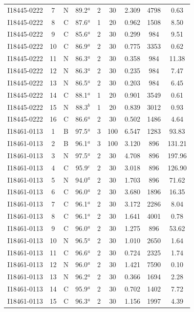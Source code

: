 \begin{table}
\begin{tabular}{ccccccccc}
I18445-0222 & 7 & N & 89.2$^{a}$ & 2 & 30 & 2.309 & 4798 & 0.63 \\
I18445-0222 & 8 & C & 87.6$^{a}$ & 1 & 20 & 0.962 & 1508 & 8.50 \\
I18445-0222 & 9 & C & 85.6$^{a}$ & 2 & 30 & 0.299 & 984 & 9.51 \\
I18445-0222 & 10 & C & 86.9$^{a}$ & 2 & 30 & 0.775 & 3353 & 0.62 \\
I18445-0222 & 11 & N & 86.3$^{a}$ & 2 & 30 & 0.358 & 984 & 11.38 \\
I18445-0222 & 12 & N & 86.3$^{a}$ & 2 & 30 & 0.235 & 984 & 7.47 \\
I18445-0222 & 13 & N & 86.5$^{a}$ & 2 & 30 & 0.203 & 984 & 6.45 \\
I18445-0222 & 14 & C & 88.1$^{a}$ & 1 & 20 & 0.901 & 3549 & 0.61 \\
I18445-0222 & 15 & N & 88.3$^{b}$ & 1 & 20 & 0.839 & 3012 & 0.93 \\
I18445-0222 & 16 & C & 86.6$^{a}$ & 2 & 30 & 0.502 & 1486 & 4.64 \\
I18461-0113 & 1 & B & 97.5$^{a}$ & 3 & 100 & 6.547 & 1283 & 93.83 \\
I18461-0113 & 2 & B & 96.1$^{a}$ & 3 & 100 & 3.120 & 896 & 131.21 \\
I18461-0113 & 3 & N & 97.5$^{a}$ & 2 & 30 & 4.708 & 896 & 197.96 \\
I18461-0113 & 4 & C & 95.9$^{c}$ & 2 & 30 & 3.018 & 896 & 126.90 \\
I18461-0113 & 5 & N & 94.0$^{a}$ & 2 & 30 & 1.703 & 896 & 71.62 \\
I18461-0113 & 6 & C & 96.0$^{a}$ & 2 & 30 & 3.680 & 1896 & 16.35 \\
I18461-0113 & 7 & C & 96.1$^{a}$ & 2 & 30 & 3.172 & 2286 & 8.04 \\
I18461-0113 & 8 & C & 96.1$^{a}$ & 2 & 30 & 1.641 & 4001 & 0.78 \\
I18461-0113 & 9 & C & 96.0$^{a}$ & 2 & 30 & 1.275 & 896 & 53.62 \\
I18461-0113 & 10 & N & 96.5$^{a}$ & 2 & 30 & 1.010 & 2650 & 1.64 \\
I18461-0113 & 11 & C & 96.6$^{a}$ & 2 & 30 & 0.724 & 2325 & 1.74 \\
I18461-0113 & 12 & N & 96.0$^{a}$ & 2 & 30 & 1.421 & 7590 & 0.10 \\
I18461-0113 & 13 & N & 96.2$^{a}$ & 2 & 30 & 0.366 & 1694 & 2.28 \\
I18461-0113 & 14 & C & 95.9$^{a}$ & 2 & 30 & 0.702 & 1402 & 7.72 \\
I18461-0113 & 15 & C & 96.3$^{a}$ & 2 & 30 & 1.156 & 1997 & 4.39 \\

\end{tabular}
\end{table}
